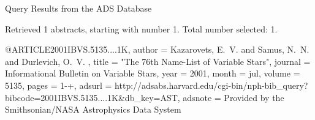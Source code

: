 Query Results from the ADS Database


Retrieved 1 abstracts, starting with number 1.  Total number selected: 1.

@ARTICLE{2001IBVS.5135....1K,
   author = {{Kazarovets}, E.~V. and {Samus}, N.~N. and {Durlevich}, O.~V.
	},
    title = "{The 76th Name-List of Variable Stars}",
  journal = {Informational Bulletin on Variable Stars},
     year = 2001,
    month = jul,
   volume = 5135,
    pages = {1-+},
   adsurl = {http://adsabs.harvard.edu/cgi-bin/nph-bib_query?bibcode=2001IBVS.5135....1K&db_key=AST},
  adsnote = {Provided by the Smithsonian/NASA Astrophysics Data System}
}



